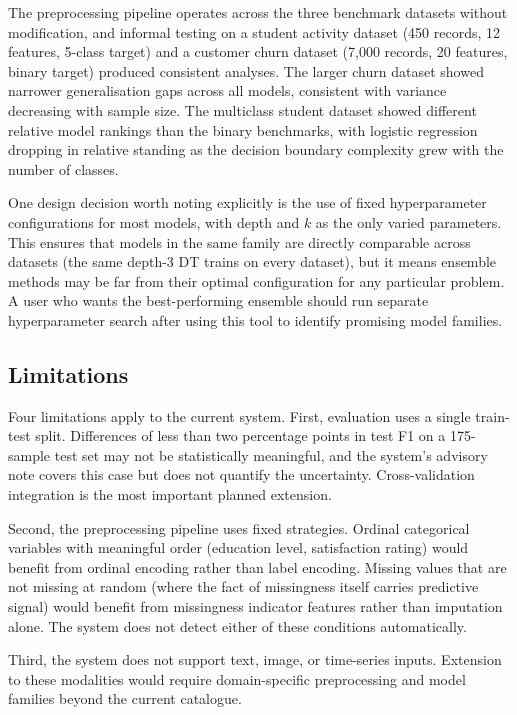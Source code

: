\documentclass[conference]{IEEEtran}
\begin{document}
The preprocessing pipeline operates across the three benchmark datasets without modification, and informal testing on a student activity dataset (450 records, 12 features, 5-class target) and a customer churn dataset (7,000 records, 20 features, binary target) produced consistent analyses. The larger churn dataset showed narrower generalisation gaps across all models, consistent with variance decreasing with sample size. The multiclass student dataset showed different relative model rankings than the binary benchmarks, with logistic regression dropping in relative standing as the decision boundary complexity grew with the number of classes.

One design decision worth noting explicitly is the use of fixed hyperparameter configurations for most models, with depth and $k$ as the only varied parameters. This ensures that models in the same family are directly comparable across datasets (the same depth-3 DT trains on every dataset), but it means ensemble methods may be far from their optimal configuration for any particular problem. A user who wants the best-performing ensemble should run separate hyperparameter search after using this tool to identify promising model families.

\subsection{Limitations}

Four limitations apply to the current system. First, evaluation uses a single train-test split. Differences of less than two percentage points in test F1 on a 175-sample test set may not be statistically meaningful, and the system's advisory note covers this case but does not quantify the uncertainty. Cross-validation integration is the most important planned extension.

Second, the preprocessing pipeline uses fixed strategies. Ordinal categorical variables with meaningful order (education level, satisfaction rating) would benefit from ordinal encoding rather than label encoding. Missing values that are not missing at random (where the fact of missingness itself carries predictive signal) would benefit from missingness indicator features rather than imputation alone. The system does not detect either of these conditions automatically.

Third, the system does not support text, image, or time-series inputs. Extension to these modalities would require domain-specific preprocessing and model families beyond the current catalogue.
\end{document}
